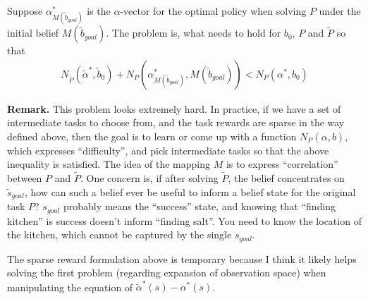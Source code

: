 \documentclass{article}
\newcommand{\td}[1]{\tilde{#1}}
\begin{document}
\begin{definition}
Suppose $\alpha^{*}_{M(\td{b}_{goal})}$ is the $\alpha$-vector for the optimal policy when solving $P$ under the initial belief $M(\td{b}_{goal})$. The problem is, what needs to hold for $b_0$, $P$ and $\td{P}$ so that %
\begin{align}
N_{\td{P}}(\td{\alpha}^*, \td{b}_0) + N_{P}(\alpha^{*}_{M(\td{b}_{goal})}, M(\td{b}_{goal})) < N_P(\alpha^*, b_0)
\end{align}
\end{definition}

\noindent \textbf{Remark.} This problem looks extremely hard. In practice, if we have a set of intermediate tasks to choose from, and the task rewards are sparse in the way defined above, then the goal is to learn or come up with a function $N_P(\alpha, b)$, which expresses ``difficulty'', and pick intermediate tasks so that the above inequality is satisfied. The idea of the mapping $M$ is to express ``correlation'' between $P$ and $\td{P}$. One concern is, if after solving $\td{P}$, the belief concentrates on $\td{s}_{goal}$, how can such a belief ever be useful to inform a belief state for the original task $P$? $s_{goal}$ probably means the ``success'' state, and knowing that ``finding kitchen'' is success doesn't inform ``finding salt''. You need to know the location of the kitchen, which cannot be captured by the single $s_{goal}$.

The sparse reward formulation above is temporary because I think it likely helps solving the first problem (regarding expansion of observation space) when manipulating the equation of $\td{\alpha}^*(s) -\alpha^*(s)$.






\end{document}
